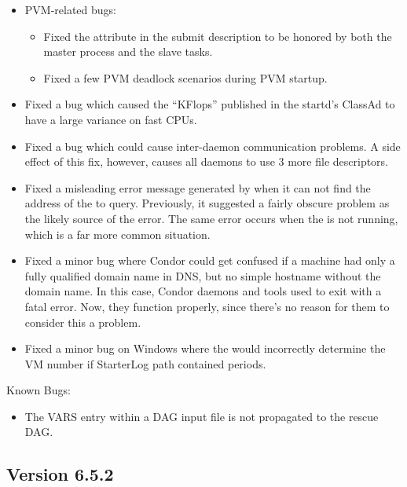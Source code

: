 \begin{itemize}
\item PVM-related bugs:
  \begin{itemize}
    \item Fixed the  attribute in the submit description 
		to be honored by both the master process and the slave tasks.
    \item Fixed a few PVM deadlock scenarios during PVM startup.
  \end{itemize}

\item Fixed a bug which caused the ``KFlops'' published in the
startd's ClassAd to have a large variance on fast CPUs.

\item Fixed a bug which could cause inter-daemon communication
problems.  A side effect of this fix, however, causes all daemons to
use 3 more file descriptors.

\item Fixed a misleading error message generated by  when it
  can not find the address of the  to query.
  Previously, it suggested a fairly obscure problem as the likely
  source of the error.
  The same error occurs when the  is not running, which
  is a far more common situation.

\item Fixed a minor bug where Condor could get confused if a machine
  had only a fully qualified domain name in DNS, but no simple
  hostname without the domain name.
  In this case, Condor daemons and tools used to exit with a fatal
  error.
  Now, they function properly, since there's no reason for them to
  consider this a problem.

 \item Fixed a minor bug on Windows where the  would
   incorrectly determine the VM number if StarterLog path contained
   periods.

\end{itemize}

\noindent Known Bugs:

\begin{itemize}

\item The VARS entry within a DAG input file is not propagated
to the rescue DAG.

\end{itemize}


\subsection{\label{sec:New-6-5-2}Version 6.5.2}

